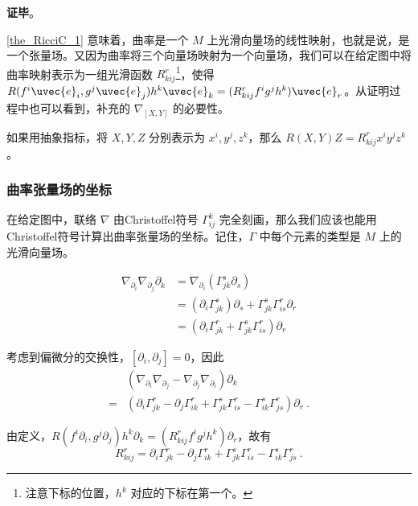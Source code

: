 \textbf{证毕}。

\autoref{the_RicciC_1} 意味着，曲率是一个 $M$ 上光滑向量场的线性映射，也就是说，是一个张量场。又因为曲率将三个向量场映射为一个向量场，我们可以在给定图中将曲率映射表示为一组光滑函数 $R^r_{kij}$\footnote{注意下标的位置，$h^k$ 对应的下标在第一个。}，使得 $R(f^i\uvec{e}_i, g^j\uvec{e}_j)h^k\uvec{e}_k=(R^r_{kij}f^ig^jh^k)\uvec{e}_r$。从证明过程中也可以看到，补充的 $\nabla_{[X, Y]}$ 的必要性。

如果用抽象指标，将 $X, Y, Z$ 分别表示为 $x^i, y^j, z^k$，那么 $R(X, Y)Z=R^r_{kij}x^iy^jz^k$。


\subsubsection{曲率张量场的坐标}

在给定图中，联络 $\nabla$ 由Christoffel符号 $\Gamma^k_{ij}$ 完全刻画，那么我们应该也能用Christoffel符号计算出曲率张量场的坐标。记住，$\Gamma$ 中每个元素的类型是 $M$ 上的光滑向量场。

\begin{equation}
\begin{aligned}
\nabla_{\partial_i}\nabla_{\partial_j}\partial_k&=\nabla_{\partial_i}(\Gamma^s_{jk}\partial_s)\\
&=(\partial_i\Gamma^s_{jk})\partial_s+\Gamma^s_{jk}\Gamma^r_{is}\partial_r\\
&=(\partial_i\Gamma^r_{jk}+\Gamma^s_{jk}\Gamma^r_{is})\partial_r
\end{aligned}
\end{equation}


考虑到偏微分的交换性，$[\partial_i, \partial_j]=0$，因此
\begin{equation}
\begin{aligned}
&(\nabla_{\partial_i}\nabla_{\partial_j}-\nabla_{\partial_j}\nabla_{\partial_i})\partial_k\\
={}&(\partial_i\Gamma^r_{jk}-\partial_j\Gamma^{r}_{ik}+\Gamma^s_{jk}\Gamma^r_{is}-\Gamma^s_{ik}\Gamma^r_{js})\partial_r~.
\end{aligned}
\end{equation}

由定义，$R(f^i\partial_i, g^j\partial_j)h^k\partial_k=(R^r_{kij}f^ig^jh^k)\partial_r$，故有
\begin{equation}\label{eq_RicciC_1}
R^r_{kij}=\partial_i\Gamma^r_{jk}-\partial_j\Gamma^{r}_{ik}+\Gamma^s_{jk}\Gamma^r_{is}-\Gamma^s_{ik}\Gamma^r_{js}~.
\end{equation}

